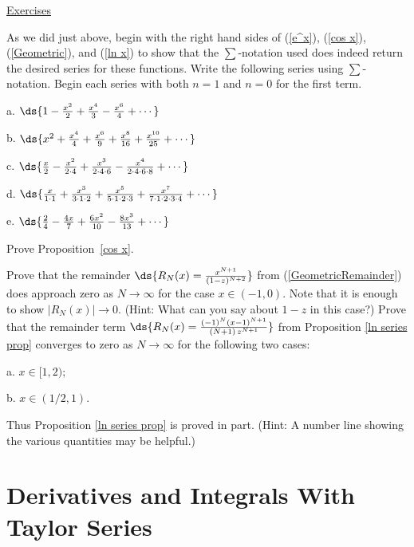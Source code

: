 \eex
\newpage
\bigskip\begin{center}{\Large \underline{Exercises}}\end{center}
\bhw As we did just above, begin with the right hand sides of
(\ref{e^x}), (\ref{cos x}), (\ref{Geometric}), and (\ref{ln x})
to show that the  $\sum$-notation used does indeed return the
desired series for these functions.
\ehw
\bhw Write the following series using $\sum$-notation.
Begin each series with both $n=1$ and $n=0$ for the first term.
\begin{description}
\item a. $\ds{1-\frac{x^2}{2}+\frac{x^4}{3}-\frac{x^6}{4}+\cdots}$ 
\item b. $\ds{x^2+\frac{x^4}{4}+\frac{x^6}{9}+\frac{x^8}{16}
+\frac{x^{10}}{25}+\cdots}$
\item c. $\ds{\frac{x}{2}-\frac{x^2}{2\cdot4}+\frac{x^3}{2\cdot4\cdot6}
-\frac{x^4}{2\cdot4\cdot6\cdot8}+\cdots}$
\item d. $\ds{\frac{x}{1\cdot1}+\frac{x^3}{3\cdot1\cdot2}
+\frac{x^5}{5\cdot1\cdot2\cdot3}+\frac{x^7}{7\cdot1\cdot2\cdot3\cdot4}
+\cdots}$ 
\item e. $\ds{\frac2{4}-\frac{4x}{7}+\frac{6x^2}{10}-\frac{8x^3}{13}
+\cdots}$ 
\end{description}
\ehw
\bhw Prove Proposition~\ref{cos x}.
\ehw

\bhw Prove that the remainder 
$\ds{R_N(x)=\frac{x^{N+1}}{(1-z)^{N+2}}}$
from (\ref{GeometricRemainder}) 
does approach zero as $N\to\infty$ 
for the case $x\in(-1,0)$. Note that it is enough
to show $|R_N(x)|\to0$.
(Hint:  What can you say about $1-z$
in this case?) 
\ehw 
\bhw Prove that the remainder term
$\ds{R_N(x)=\frac{(-1)^N(x-1)^{N+1}}{(N+1)\,z^{N+1}}}$
from  Proposition \ref{ln series prop} converges to zero as $N\to\infty$
for the following two cases:
\begin{description}
\item a. $x\in[1,2)$; 
\item b. $x\in(1/2,1)$.  
\end{description}
Thus Proposition \ref{ln series prop} is proved in part. (Hint: A number
line showing the various quantities may be helpful.) 
\label{partiallnintervalproof} 
\ehw 


\newpage 
\section{Derivatives and Integrals
 With Taylor Series \label{D&I}}
\bigskip

